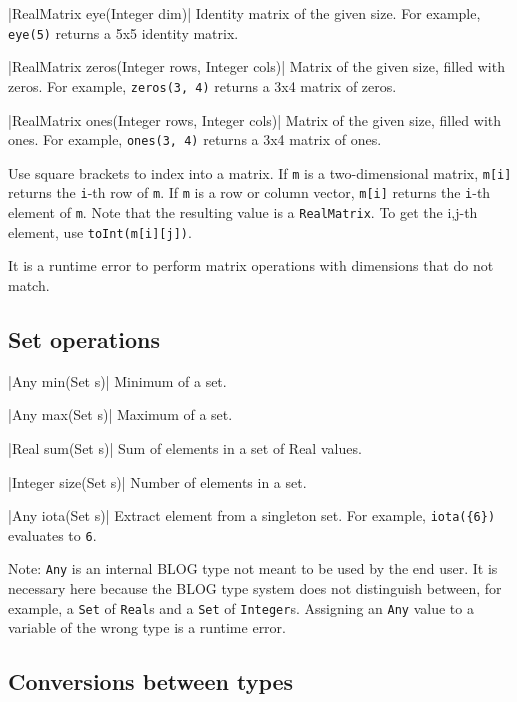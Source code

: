 \blog|RealMatrix eye(Integer dim)|
\myindent Identity matrix of the given size.
For example, \verb|eye(5)| returns a 5x5 identity matrix.

\blog|RealMatrix zeros(Integer rows, Integer cols)|
\myindent Matrix of the given size, filled with zeros.
For example, \verb|zeros(3, 4)| returns a 3x4 matrix of zeros.

\blog|RealMatrix ones(Integer rows, Integer cols)|
\myindent Matrix of the given size, filled with ones.
For example, \verb|ones(3, 4)| returns a 3x4 matrix of ones.



Use square brackets to index into a matrix. If \verb|m| is a two-dimensional
matrix, \verb|m[i]| returns the \verb|i|-th row of \verb|m|. If \verb|m| is a
row or column vector, \verb|m[i]| returns the \verb|i|-th element of \verb|m|.
Note that the resulting value is a \verb|RealMatrix|. To get the i,j-th
element, use \verb|toInt(m[i][j])|.

It is a runtime error to perform matrix operations with dimensions that do not
match.


\subsection{Set operations}
\label{sec:builtin-set-ops}

\blog|Any min(Set s)|
\myindent Minimum of a set.

\blog|Any max(Set s)|
\myindent Maximum of a set.

\blog|Real sum(Set s)|
\myindent Sum of elements in a set of Real values.

\blog|Integer size(Set s)|
\myindent Number of elements in a set.

\blog|Any iota(Set s)|
\myindent Extract element from a singleton set.
For example, \verb|iota({6})| evaluates to \verb|6|.

Note: \verb|Any| is an internal BLOG type not meant to be used by the end user.
It is necessary here because the BLOG type system does not distinguish between,
for example, a \verb|Set| of \verb|Real|s and a \verb|Set| of \verb|Integer|s.
Assigning an \verb|Any| value to a variable of the wrong type is a runtime
error.


\subsection{Conversions between types}
\label{sec:builtin-conversions}

